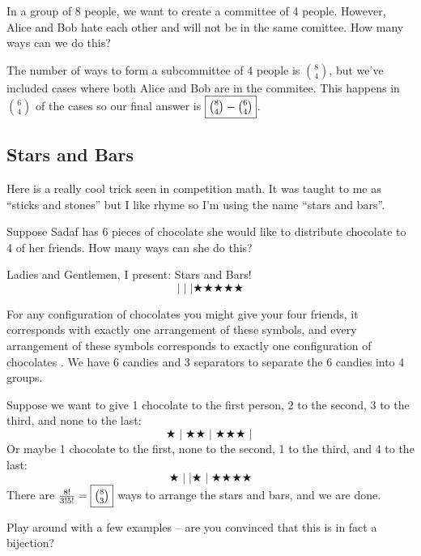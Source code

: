 \documentclass{scrartcl}
\begin{document}
	\begin{example}
		In a group of 8 people, we want to create a committee of 4 people. However, Alice and Bob hate each other and will not be in the same comittee. How many ways can we do this?
	\end{example}
	\begin{soln}
		The number of ways to form a subcommittee of 4 people is $\binom{8}{4}$, but we've included cases where both Alice and Bob are in the commitee. This happens in $\binom{6}{4}$ of the cases so our final answer is $\boxed{\tbinom{8}{4} - \tbinom{6}{4}}$.
	\end{soln}



	\subsection{Stars and Bars}
	Here is a really cool trick seen in competition math. It was taught to me as ``sticks and stones'' but I like rhyme so I'm using the name ``stars and bars''.
	\begin{example}
		Suppose Sadaf has 6 pieces of chocolate she would like to distribute chocolate to 4 of her friends. How many ways can she do this?
	\end{example}
	\begin{soln}
		Ladies and Gentlemen, I present: Stars and Bars!
		\[\mid\mid\mid\bigstar\bigstar\bigstar\bigstar\bigstar\]

		For any configuration of chocolates you might give your four friends, it corresponds with exactly one arrangement of these symbols, and every arrangement of these symbols corresponds to exactly one configuration of chocolates . We have 6 candies and 3 separators to separate the 6 candies into 4 groups.
		
		Suppose we want to give 1 chocolate to the first person, 2 to the second, 3 to the third, and none to the last:
		\[\bigstar\mid\bigstar\bigstar\mid\bigstar\bigstar\bigstar\mid\]
		Or maybe 1 chocolate to the first, none to the second, 1 to the third, and 4 to the last:
		\[\bigstar\mid\mid\bigstar\mid\bigstar\bigstar\bigstar\bigstar\]
		There are $\frac{8!}{3!5!} = \boxed{\tbinom{8}{3}}$ ways to arrange the stars and bars, and we are done.
	\end{soln}

	\begin{exercise}
		Play around with a few examples -- are you convinced that this is in fact a bijection?
	\end{exercise}
\end{document}
